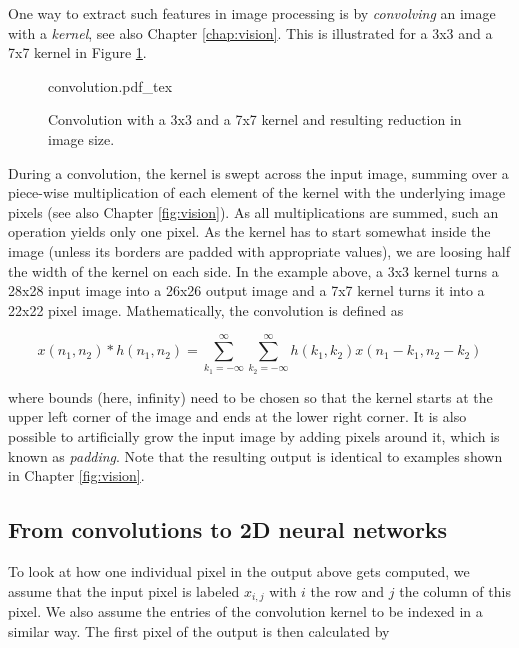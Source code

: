 One way to extract such features in image processing is by \emph{convolving} an image with a \emph{kernel}, see also Chapter \ref{chap:vision}. This is illustrated for a 3x3 and a 7x7 kernel in Figure \ref{fig:convolution}.


\begin{figure}[htb]
    \centering
    \def\svgwidth{0.8\textwidth}
    {convolution.pdf_tex}
    \caption{Convolution with a 3x3 and a 7x7 kernel and resulting reduction in image size.\label{fig:convolution}}
\end{figure}

During a convolution, the kernel is swept across the input image, summing over a piece-wise multiplication of each element of the kernel with the underlying image pixels (see also Chapter \ref{fig:vision}). As all multiplications are summed, such an operation yields only one pixel. As the kernel has to start somewhat inside the image (unless its borders are padded with appropriate values), we are loosing half the width of the kernel on each side. In the example above, a 3x3 kernel turns a 28x28 input image into a 26x26 output image and a 7x7 kernel turns it into a 22x22 pixel image. Mathematically, the convolution is defined as

\begin{equation}
x(n_1,n_2)*h(n_1,n_2)=\sum_{k_1=-\infty}^{\infty} \sum_{k_2=-\infty}^{\infty} h(k_1,k_2)x(n_1-k_1,n_2-k_2)
\end{equation}

where bounds (here, infinity) need to be chosen so that the kernel starts at the upper left corner of the image and ends at the lower right corner. It is also possible to artificially grow the input image by adding pixels around it, which is known as \emph{padding}. Note that the resulting output is identical to examples shown in Chapter \ref{fig:vision}.

\subsection{From convolutions to 2D neural networks}

To look at how one individual pixel in the output above gets computed, we assume that the input pixel is labeled $x_{i,j}$ with $i$ the row and $j$ the column of this pixel. We also assume the entries of the convolution kernel to be indexed in a similar way. The first pixel of the output is then calculated by


